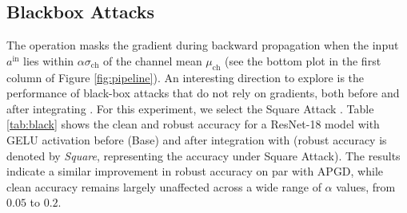 \documentclass[conference]{IEEEtran}
\begin{document}
\begin{table}[h]
\centering
\footnotesize
\caption{Clean and APGD accuracy of ResNet-18 model with GELU activation function over CIFAR-10 test set before (Base) and after integration with \sys technique for different value of $\alpha$ and different  threat models from RobustBesnch \cite{reoch20}}
\renewcommand{\arraystretch}{1.3}
\label{tab:threat}
\centering
\setlength\tabcolsep{2pt}
\end{table}




\subsection{Blackbox Attacks}\label{abl:black}
The \sys operation masks the gradient during backward propagation when the input $a^{\mathrm{in}}$ lies within $\alpha\sigma_{\mathrm{ch}}$ of the channel mean $\mu_{\mathrm{ch}}$ (see the bottom plot in the first column of Figure \mbox{\ref{fig:pipeline}}). An interesting direction to explore is the performance of black-box attacks that do not rely on gradients, both before and after integrating \sys. For this experiment, we select the Square Attack \mbox{\cite{saaac20}}. Table \mbox{\ref{tab:black}} shows the clean and robust accuracy for a ResNet-18 model with GELU activation before (Base) and after integration with \sys (robust accuracy is denoted by \mbox{\textit{Square}}, representing the accuracy under Square Attack). The results indicate a similar improvement in robust accuracy on par with APGD, while clean accuracy remains largely unaffected across a wide range of $\alpha$ values, from $0.05$ to $0.2$.
\end{document}
